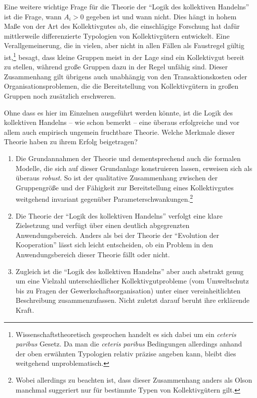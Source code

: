 \documentclass[12pt,a4paper,ngerman]{article}
\begin{document}
Eine weitere wichtige Frage für die Theorie der "`Logik des kollektiven
Handelns"' ist die Frage, wann \begin{math}A_i > 0\end{math} gegeben ist und
wann nicht. Dies hängt in hohem Maße von der Art des Kollektivgutes
ab, die einschlägige Forschung hat dafür mittlerweile differenzierte
Typologien von Kollektivgütern entwickelt. Eine Verallgemeinerung, die
in vielen, aber nicht in allen Fällen als Faustregel gültig
ist,\footnote{Wissenschaftstheoretisch gesprochen handelt es sich
dabei um ein {\em ceteris paribus} Gesetz. Da man die {\em ceteris
paribus} Bedingungen allerdings anhand der oben erwähnten Typologien
relativ präzise angeben kann, bleibt dies weitgehend unproblematisch.}
besagt, dass kleine Gruppen meist in der Lage sind ein Kollektivgut
bereit zu stellen, während große Gruppen dazu in der Regel unfähig
sind. Dieser Zusammenhang gilt übrigens auch unabhängig von den
Transaktionskosten oder Organisationsproblemen, die die Bereitstellung
von Kollektivgütern in großen Gruppen noch zusätzlich erschweren.

Ohne dass es hier im Einzelnen ausgeführt werden könnte, ist die Logik
des kollektiven Handelns -- wie schon bemerkt -- eine überaus
erfolgreiche und vor allem auch empirisch ungemein fruchtbare
Theorie. Welche Merkmale dieser Theorie haben zu ihrem Erfolg
beigetragen?

\begin{enumerate}

\item Die Grundannahmen der Theorie und dementsprechend auch die 
formalen Modelle, die sich auf dieser Grundanlage konstruieren 
lassen, erweisen sich als überaus {\em robust}. So ist der qualitative
Zusammenhang zwischen der Gruppengröße und der Fähigkeit
zur Bereitstellung eines Kollektivgutes weitgehend invariant 
gegenüber Parameterschwankungen.\footnote{Wobei allerdings zu 
beachten ist, dass dieser Zusammenhang anders als Olson manchmal 
suggeriert nur für bestimmte Typen von Kollektivgütern gilt.}

\item  Die Theorie der "`Logik des kollektiven Handelns"' verfolgt 
eine klare Zielsetzung und verfügt über einen deutlich abgegrenzten 
Anwendungsbereich. Anders als bei der Theorie der "`Evolution der 
Kooperation"' lässt sich leicht entscheiden, ob ein Problem in den 
Anwendungsbereich dieser Theorie fällt oder nicht.

\item Zugleich ist die "`Logik des kollektiven Handelns"' aber 
auch abstrakt genug um eine Vielzahl unterschiedlicher 
Kollektivgutprobleme (vom Umweltschutz bis zu Fragen der 
Gewerkschaftsorganisation) unter einer vereinheitlichten 
Beschreibung zusammenzufassen. Nicht zuletzt darauf beruht 
ihre erklärende Kraft. 

\end{enumerate}
\end{document}
